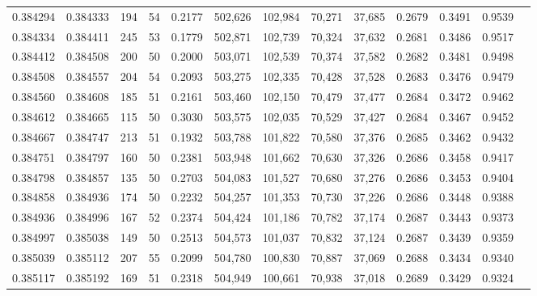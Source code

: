 \begin{tabular}{rrrrrrrrrrrrr}
0.384294 & 0.384333 &   194 &  54 &                                     0.2177 & 502,626 & 102,984 &  70,271 &  37,685 & 0.2679 & 0.3491 & 0.9539 \\
0.384334 & 0.384411 &   245 &  53 &                                     0.1779 & 502,871 & 102,739 &  70,324 &  37,632 & 0.2681 & 0.3486 & 0.9517 \\
0.384412 & 0.384508 &   200 &  50 &                                     0.2000 & 503,071 & 102,539 &  70,374 &  37,582 & 0.2682 & 0.3481 & 0.9498 \\
0.384508 & 0.384557 &   204 &  54 &                                     0.2093 & 503,275 & 102,335 &  70,428 &  37,528 & 0.2683 & 0.3476 & 0.9479 \\
0.384560 & 0.384608 &   185 &  51 &                                     0.2161 & 503,460 & 102,150 &  70,479 &  37,477 & 0.2684 & 0.3472 & 0.9462 \\
0.384612 & 0.384665 &   115 &  50 &                                     0.3030 & 503,575 & 102,035 &  70,529 &  37,427 & 0.2684 & 0.3467 & 0.9452 \\
0.384667 & 0.384747 &   213 &  51 &                                     0.1932 & 503,788 & 101,822 &  70,580 &  37,376 & 0.2685 & 0.3462 & 0.9432 \\
0.384751 & 0.384797 &   160 &  50 &                                     0.2381 & 503,948 & 101,662 &  70,630 &  37,326 & 0.2686 & 0.3458 & 0.9417 \\
0.384798 & 0.384857 &   135 &  50 &                                     0.2703 & 504,083 & 101,527 &  70,680 &  37,276 & 0.2686 & 0.3453 & 0.9404 \\
0.384858 & 0.384936 &   174 &  50 &                                     0.2232 & 504,257 & 101,353 &  70,730 &  37,226 & 0.2686 & 0.3448 & 0.9388 \\
0.384936 & 0.384996 &   167 &  52 &                                     0.2374 & 504,424 & 101,186 &  70,782 &  37,174 & 0.2687 & 0.3443 & 0.9373 \\
0.384997 & 0.385038 &   149 &  50 &                                     0.2513 & 504,573 & 101,037 &  70,832 &  37,124 & 0.2687 & 0.3439 & 0.9359 \\
0.385039 & 0.385112 &   207 &  55 &                                     0.2099 & 504,780 & 100,830 &  70,887 &  37,069 & 0.2688 & 0.3434 & 0.9340 \\
0.385117 & 0.385192 &   169 &  51 &                                     0.2318 & 504,949 & 100,661 &  70,938 &  37,018 & 0.2689 & 0.3429 & 0.9324 \\

\end{tabular}
